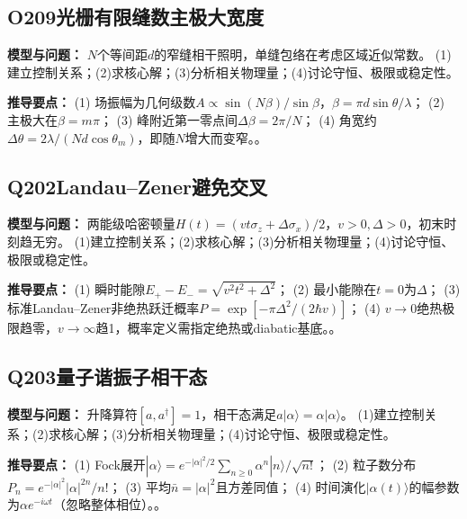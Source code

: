 \par\medskip

\subsection*{O209\quad 光栅有限缝数主极大宽度}

\textbf{模型与问题：} $N$个等间距$d$的窄缝相干照明，单缝包络在考虑区域近似常数。 (1)建立控制关系；(2)求核心解；(3)分析相关物理量；(4)讨论守恒、极限或稳定性。

\par\textbf{推导要点：} (1) 场振幅为几何级数$A\propto\sin(N\beta)/\sin\beta$，$\beta=\pi d\sin\theta/\lambda$； (2) 主极大在$\beta=m\pi$； (3) 峰附近第一零点间$\Delta\beta=2\pi/N$； (4) 角宽约$\Delta\theta=2\lambda/(Nd\cos\theta_m)$，即随$N$增大而变窄。。

\par\medskip

\subsection*{Q202\quad Landau–Zener避免交叉}

\textbf{模型与问题：} 两能级哈密顿量$H(t)=(vt\sigma_z+\Delta\sigma_x)/2$，$v>0,\Delta>0$，初末时刻趋无穷。 (1)建立控制关系；(2)求核心解；(3)分析相关物理量；(4)讨论守恒、极限或稳定性。

\par\textbf{推导要点：} (1) 瞬时能隙$E_+-E_-=\sqrt{v^2t^2+\Delta^2}$； (2) 最小能隙在$t=0$为$\Delta$； (3) 标准Landau–Zener非绝热跃迁概率$P=\exp[-\pi\Delta^2/(2\hbar v)]$； (4) $v\to0$绝热极限趋零，$v\to\infty$趋1，概率定义需指定绝热或diabatic基底。。

\par\medskip

\subsection*{Q203\quad 量子谐振子相干态}

\textbf{模型与问题：} 升降算符$[a,a^\dagger]=1$，相干态满足$a|\alpha\rangle=\alpha|\alpha\rangle$。 (1)建立控制关系；(2)求核心解；(3)分析相关物理量；(4)讨论守恒、极限或稳定性。

\par\textbf{推导要点：} (1) Fock展开$|\alpha\rangle=e^{-|\alpha|^2/2}\sum_{n\ge0}\alpha^n|n\rangle/\sqrt{n!}$； (2) 粒子数分布$P_n=e^{-|\alpha|^2}|\alpha|^{2n}/n!$； (3) 平均$\bar n=|\alpha|^2$且方差同值； (4) 时间演化$|\alpha(t)\rangle$的幅参数为$\alpha e^{-i\omega t}$（忽略整体相位）。。

